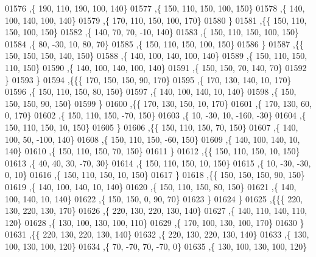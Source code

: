 \begin{DoxyCode}
01576     ,\{   190,   110,   190,   100,   140\}
01577     ,\{   150,   110,   150,   100,   150\}
01578     ,\{   140,   100,   140,   100,   140\}
01579     ,\{   170,   110,   150,   100,   170\}
01580     \}
01581    ,\{\{   150,   110,   150,   100,   150\}
01582     ,\{   140,    70,    70,   -10,   140\}
01583     ,\{   150,   110,   150,   100,   150\}
01584     ,\{    80,   -30,    10,    80,    70\}
01585     ,\{   150,   110,   150,   100,   150\}
01586     \}
01587    ,\{\{   150,   150,   150,   140,   150\}
01588     ,\{   140,   100,   140,   100,   140\}
01589     ,\{   150,   110,   150,   110,   150\}
01590     ,\{   140,   100,   140,   100,   140\}
01591     ,\{   150,   150,    70,   140,    70\}
01592     \}
01593    \}
01594   ,\{\{\{   170,   150,   150,    90,   170\}
01595     ,\{   170,   130,   140,    10,   170\}
01596     ,\{   150,   110,   150,    80,   150\}
01597     ,\{   140,   100,   140,    10,   140\}
01598     ,\{   150,   150,   150,    90,   150\}
01599     \}
01600    ,\{\{   170,   130,   150,    10,   170\}
01601     ,\{   170,   130,    60,     0,   170\}
01602     ,\{   150,   110,   150,   -70,   150\}
01603     ,\{    10,   -30,    10,  -160,   -30\}
01604     ,\{   150,   110,   150,    10,   150\}
01605     \}
01606    ,\{\{   150,   110,   150,    70,   150\}
01607     ,\{   140,   100,    50,  -100,   140\}
01608     ,\{   150,   110,   150,   -60,   150\}
01609     ,\{   140,   100,   140,    10,   140\}
01610     ,\{   150,   110,   150,    70,   150\}
01611     \}
01612    ,\{\{   150,   110,   150,    10,   150\}
01613     ,\{    40,    40,    30,   -70,    30\}
01614     ,\{   150,   110,   150,    10,   150\}
01615     ,\{    10,   -30,   -30,     0,    10\}
01616     ,\{   150,   110,   150,    10,   150\}
01617     \}
01618    ,\{\{   150,   150,   150,    90,   150\}
01619     ,\{   140,   100,   140,    10,   140\}
01620     ,\{   150,   110,   150,    80,   150\}
01621     ,\{   140,   100,   140,    10,   140\}
01622     ,\{   150,   150,     0,    90,    70\}
01623     \}
01624    \}
01625   ,\{\{\{   220,   130,   220,   130,   170\}
01626     ,\{   220,   130,   220,   130,   140\}
01627     ,\{   140,   110,   140,   110,   120\}
01628     ,\{   130,   100,   130,   100,   110\}
01629     ,\{   170,   100,   130,   100,   170\}
01630     \}
01631    ,\{\{   220,   130,   220,   130,   140\}
01632     ,\{   220,   130,   220,   130,   140\}
01633     ,\{   130,   100,   130,   100,   120\}
01634     ,\{    70,   -70,    70,   -70,     0\}
01635     ,\{   130,   100,   130,   100,   120\}

\end{DoxyCode}
